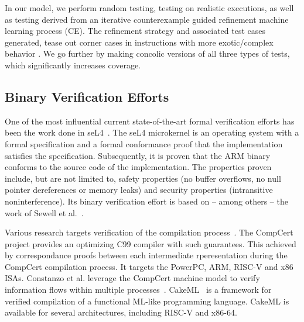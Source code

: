 In our model, we perform random testing, testing on realistic executions, as well as testing derived from an iterative counterexample guided refinement machine learning process (CE). The refinement strategy and associated test cases generated, tease out corner cases in instructions with more exotic/complex behavior \cite{heule2016}. We go further by making concolic versions of all three types of tests, which significantly  increases coverage.
\subsection{Binary Verification Efforts}\label{sec:machine_model_overview}

One of the most influential current state-of-the-art formal verification efforts has been the work done in seL4~\cite{klein2009sel4,murray2013sel4}. The seL4 microkernel is an operating system with a formal specification and a formal conformance proof that the implementation satisfies the specification. Subsequently, it is proven that the ARM binary conforms to the source code of the implementation. The properties proven include, but are not limited to, safety properties (no buffer overflows, no null pointer dereferences or memory leaks) and security properties (intransitive noninterference).
Its binary verification effort is based on -- among others -- the work of Sewell et al.~\cite{sewell2013translation}.


Various research targets verification of the compilation process~\cite{kumar2014cakeml, sewell2013translation, Leroy-backend, leroy2009formal, leroy2012compcert}.
The CompCert project provides an optimizing C99 compiler with such guarantees.
This achieved by correspondance proofs between each intermediate rperesentation during the CompCert compilation process.
It targets the PowerPC, ARM, RISC-V and x86 ISAs.
 Constanzo et al. leverage the CompCert machine model to verify information flows within multiple processes~\cite {costanzo2016end}.
CakeML~\cite{kumar2014cakeml,tan2016new} is a framework for verified compilation of a functional ML-like programming language. CakeML is available for several architectures, including RISC-V and x86-64. 




